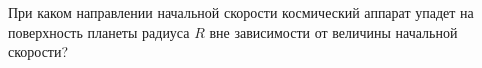 При каком направлении начальной скорости космический аппарат упадет на поверхность планеты радиуса $R$ вне зависимости 
от величины начальной скорости?